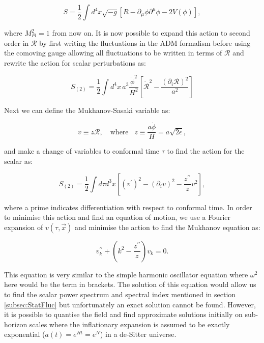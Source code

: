 \documentclass[a4paper,12pt,twoside]{report}
\begin{document}
\begin{equation} \label{eq2.58}
S = \frac{1}{2} \int d^{4} x \sqrt{-g} \left[R - \partial_{\mu}\phi \partial^{\mu}\phi - 2V(\phi) \right],
\end{equation}

where $M_{Pl}^{2} = 1$ from now on. It is now possible to expand this action to second order in $\mathcal{R}$ by first writing the fluctuations in the ADM formalism \cite{Arnowitt:1962hi} before using the comoving gauge allowing all fluctuations to be written in terms of $\mathcal{R}$ \cite{Mukhanov:1990me, Maldacena:2002vr, Baumann:2009ds} and rewrite the action for scalar perturbations as:

\begin{equation} \label{eq2.59}
S_{(2)} = \frac{1}{2} \int d^{4}x \hspace{2pt} a^{3} \frac{\dot{\phi}^{2}}{H^{2}}\left[ \dot{\mathcal{R}}^{2} - \frac{(\partial_{i}\mathcal{R})^{2}}{a^{2}} \right]
\end{equation}

Next we can define the Mukhanov-Sasaki variable \cite{Mukhanov:1985rz, Sasaki:1986hm} as:

\begin{equation} \label{eq2.60}
v \equiv z\mathcal{R}, \quad \mathrm{where} \hspace{10pt} z \equiv \frac{a\dot{\phi}}{H} = a \sqrt{2\epsilon}, 
\end{equation}

and make a change of variables to conformal time $\tau$ to find the action for the scalar as:

\begin{equation} \label{eq2.61}
S_{(2)} = \frac{1}{2} \int d\tau d^{3}x \left[(v^{\prime})^{2} - (\partial_{i}v)^{2} - \frac{z^{\prime \prime}}{z}v^{2} \right],
\end{equation}

where a prime indicates differentiation with respect to conformal time. In order to minimise this action and find an equation of motion, we use a Fourier expansion of $v(\tau, \vec{x})$ and minimise the action to find the Mukhanov equation as:

\begin{equation} \label{eq2.62}
v_{k}^{\prime \prime} + \left( k^{2} - \frac{z^{\prime \prime}}{z} \right)v_{k} = 0.
\end{equation}

This equation is very similar to the simple harmonic oscillator equation where $\omega^{2}$ here would be the term in brackets. The solution of this equation would allow us to find the scalar power spectrum and spectral index mentioned in section \ref{subsec:StatFluc} but unfortunately an exact solution cannot be found. However, it is possible to quantise the field and find approximate solutions initially on sub-horizon scales where the inflationary expansion is assumed to be exactly exponential ($a(t) = e^{Ht} = e^{N}$) in a de-Sitter universe. 
\end{document}

